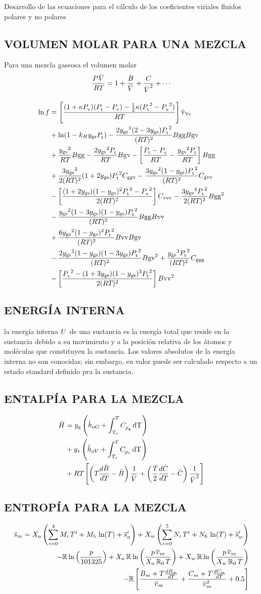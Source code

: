Desarrollo de las ecuaciones para el cálculo de los coeficientes viriales fluidos polares y no polares





\subsection{VOLUMEN MOLAR PARA UNA MEZCLA}
    Para una mezcla gaseosa el volumen molar
    \begin{equation}
      \eqVirialForVDevelopForMixture
    \end{equation}
    \namingEqVirialForVDevelopMixture


\begin{align}
  \eqVirialFactorCorrection{}
\end{align}
\namingEqVirialFactorCorrection{}


\subsection{ENERGÍA INTERNA}
\parencite{Treybal.Mass.Transfer.1981} la energía interna $\internalEnergy$ de una sustancia es la energía total que reside en la sustancia debido a su movimiento y a la posición relativa de los átomos y moléculas que constituyen la sustancia. Los valores absolutos de la energía interna no son conocidas; sin embargo, su valor puede ser calculado respecto a un estado standard definido pra la sustancia.

\subsection{ENTALPÍA PARA LA MEZCLA}
  \begin{equation}
    \eqEnthalpyForMixture
  \end{equation}
    \namingEqEnthalpyForMixture


\subsection{ENTROPÍA PARA LA MEZCLA}
  \begin{equation}
    \eqEntropyForMixtureDiscrete
  \end{equation}